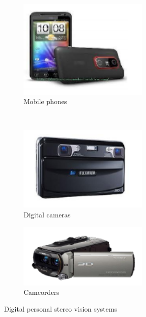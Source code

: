 \begin{figure}[h!]
\centering
\begin{subfigure}[]{0.4\textwidth}
\centering
\includegraphics[width=0.7\textwidth]{./img/devices1.png}
\caption{\scriptsize{Mobile phones}}
\end{subfigure}%
~ %
\begin{subfigure}[]{0.25\textwidth}
\centering
\includegraphics[width=0.7\textwidth]{./img/devices2.png}
\caption{\scriptsize{Digital cameras}}
\end{subfigure} 
\begin{subfigure}[]{0.4\textwidth}
\centering
\includegraphics[width=0.7\textwidth]{./img/devices3.png}
\caption{\scriptsize{Camcorders}}
\end{subfigure}%
\caption{\small{Digital personal stereo vision systems}}\label{fig:mobile}
\end{figure}
